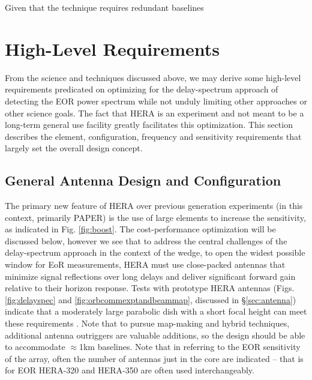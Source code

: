 \documentclass[preprint,11pt]{aastex}
\begin{document}
Given that the technique requires redundant baselines

\section{High-Level Requirements} 
\label{sec:requirements}
From the science and techniques discussed above, we may derive some high-level requirements predicated on optimizing for the delay-spectrum approach of detecting the EOR power spectrum while not unduly limiting other approaches or other science goals.  The fact that HERA is an experiment and not meant to be a long-term general use facility greatly facilitates this optimization. This section describes the element, configuration, frequency and sensitivity requirements that largely set the overall design concept.

\subsection{General Antenna Design and Configuration}
The primary new feature of HERA over previous generation experiments (in this context, primarily PAPER) is the use of large elements to increase the sensitivity, as indicated in Fig. \ref{fig:boost}.  The cost-performance optimization will 
be discussed below, however we see that to address the central challenges of the delay-spectrum approach in the context of the wedge, to open the widest possible window for EoR measurements, 
HERA must use close-packed antennas that
minimize signal reflections over long delays and deliver significant forward gain relative to their horizon response.
Tests with prototype HERA antennas (Figs.  \ref{fig:delayspec} and \ref{fig:orbcommexptandbeammap}, discussed in \S\ref{sec:antenna})
indicate that a moderately large parabolic dish with a short focal height can meet these requirements
\citep{ewall-wice_et_al2016-EoXLimits,neben_et_al2016,thyagarajan_et_al2016}.  Note that to pursue map-making and hybrid techniques, additional antenna outriggers are valuable additions, so the design
should be able to accommodate $\approx$1km baselines.  Note that in referring to the EOR sensitivity of the array, often the number of antennas just in the core are
indicated -- that is for EOR HERA-320 and HERA-350 are often used interchangeably.
\end{document}
